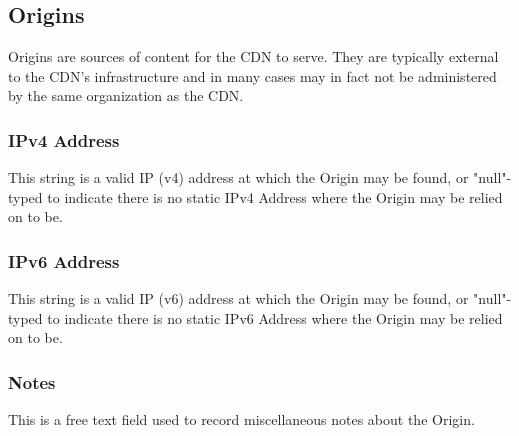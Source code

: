 %
%

\subsection{Origins}
Origins are sources of content for the CDN to serve. They are typically external
to the CDN's infrastructure and in many cases may in fact not be administered by
the same organization as the CDN.


\subsubsection{IPv4 Address}
This string is a valid IP (v4) address at which the Origin may be found, or
"null"-typed to indicate there is no static IPv4 Address where the Origin may be
relied on to be.

\subsubsection{IPv6 Address}
This string is a valid IP (v6) address at which the Origin may be found, or
"null"-typed to indicate there is no static IPv6 Address where the Origin may be
relied on to be.

\subsubsection{Notes}
This is a free text field used to record miscellaneous notes about the Origin.

